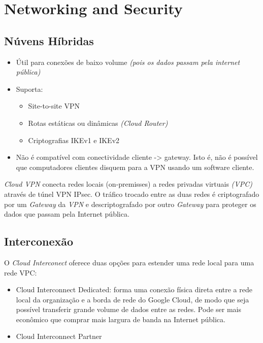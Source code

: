 \documentclass[
]{book}
\providecommand{\tightlist}{%
  \setlength{\itemsep}{0pt}\setlength{\parskip}{0pt}}
\begin{document}
\hypertarget{networking-and-security}{%
\chapter{Networking and Security}\label{networking-and-security}}

\hypertarget{nuxfavens-huxedbridas}{%
\section{Núvens Híbridas}\label{nuxfavens-huxedbridas}}

\begin{itemize}
\tightlist
\item
  Útil para conexões de baixo volume \emph{(pois os dados passam pela internet
  pública)}
\item
  Suporta:

  \begin{itemize}
  \tightlist
  \item
    Site-to-site VPN
  \item
    Rotas estáticas ou dinâmicas \emph{(Cloud Router)}
  \item
    Criptografias IKEv1 e IKEv2
  \end{itemize}
\item
  Não é compatível com conectividade cliente -\textgreater{} gateway. Isto é, não é possível
  que computadores clientes disquem para a VPN usando um software cliente.
\end{itemize}

\emph{Cloud VPN} conecta redes locais (on-premisses) a redes privadas virtuais
\emph{(VPC)} através de túnel VPN IPsec. O tráfico trocado entre as duas redes
é criptografado por um \emph{Gateway} da \emph{VPN} e descriptografado por outro
\emph{Gateway} para proteger os dados que passam pela Internet pública.

\hypertarget{interconexuxe3o}{%
\section{Interconexão}\label{interconexuxe3o}}

O \emph{Cloud Interconect} oferece duas opções para estender uma rede local para uma
rede VPC:

\begin{itemize}
\tightlist
\item
  Cloud Interconnect Dedicated: forma uma conexão física direta entre a rede
  local da organização e a borda de rede do Google Cloud, de modo que seja
  possível transferir grande volume de dados entre as redes. Pode ser mais
  econômico que comprar mais largura de banda na Internet pública.
\item
  Cloud Interconnect Partner
\end{itemize}

  
\end{document}
